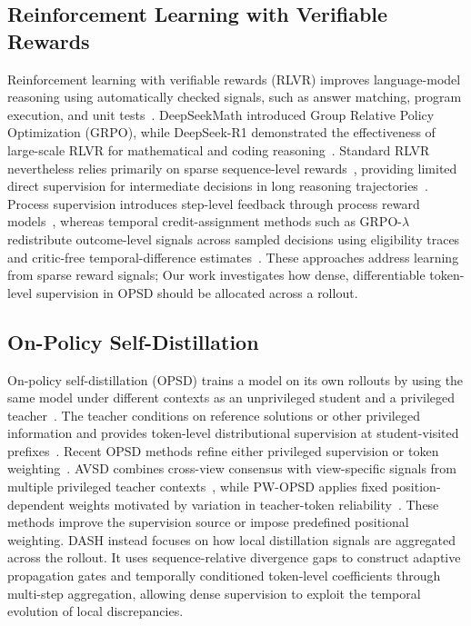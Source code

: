 \documentclass[letterpaper]{article} %
\begin{document}
\subsection{Reinforcement Learning with Verifiable Rewards}


Reinforcement learning with verifiable rewards (RLVR) improves language-model reasoning using automatically checked signals, such as answer matching, program execution, and unit tests~\cite{lambert2024tulu3,cobbe2021gsm8k,chen2021codex}. DeepSeekMath introduced Group Relative Policy Optimization (GRPO), while DeepSeek-R1 demonstrated the effectiveness of large-scale RLVR for mathematical and coding reasoning~\cite{shao2024deepseekmath,guo2025deepseekr1}. Standard RLVR nevertheless relies primarily on sparse sequence-level rewards~\cite{schulman2017ppo,yu2025dapo,yue2025rlvr}, providing limited direct supervision for intermediate decisions in long reasoning trajectories~\cite{wei2022cot,uesato2022solving}. Process supervision introduces step-level feedback through process reward models~\cite{lightman2024verify,uesato2022solving,wang2024mathshepherd,setlur2025pav}, whereas temporal credit-assignment methods such as GRPO-$\lambda$ redistribute outcome-level signals across sampled decisions using eligibility traces and critic-free temporal-difference estimates~\cite{parthasarathi2025grpolambda,sutton1988td,schulman2016gae,kazemnejad2025vineppo}. These approaches address learning from sparse reward signals; Our work investigates how dense, differentiable token-level supervision in OPSD should be allocated across a rollout.


\subsection{On-Policy Self-Distillation}

On-policy self-distillation (OPSD) trains a model on its own rollouts by using the same model under different contexts as an unprivileged student and a privileged teacher~\cite{agarwal2024onpolicy,gu2024minillm,zelikman2022star}. The teacher conditions on reference solutions or other privileged information and provides token-level distributional supervision at student-visited prefixes~\cite{zhao2026selfdistilled,vapnik2009lupi,lopezpaz2016privileged,pinto2018asymmetric,weihs2021imitation}. Recent OPSD methods refine either privileged supervision or token weighting~\cite{jin2026eopd,li2026phf,xie2026iwopd,lin2026renio,shen2026purified,liu2026teacherhelp}. AVSD combines cross-view consensus with view-specific signals from multiple privileged teacher contexts~\cite{nguyen2026avsd}, while PW-OPSD applies fixed position-dependent weights motivated by variation in teacher-token reliability~\cite{liu2026pwopsd}. These methods improve the supervision source or impose predefined positional weighting. DASH instead focuses on how local distillation signals are aggregated across the rollout. It uses sequence-relative divergence gaps to construct adaptive propagation gates and temporally conditioned token-level coefficients through multi-step aggregation, allowing dense supervision to exploit the temporal evolution of local discrepancies.
\end{document}
